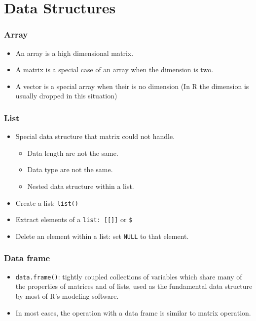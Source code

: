 \documentclass[10pt]{beamer}
\begin{document}
\section{Data Structures}

\begin{frame}
  \frametitle{Array}

  \begin{itemize}
  \item An array is a high dimensional matrix.
  \item A matrix is a special case of an array when the dimension is
    two.
  \item A vector is a special array when their is no dimension (In R
    the dimension is usually dropped in this situation)
  \end{itemize}
\end{frame}

\begin{frame}
  \frametitle{List}

  \begin{itemize}
  \item Special data structure that matrix could not handle.

    \begin{itemize}
    \item Data length are not the same.
    \item Data type are not the same.
    \item Nested data structure within a list.
    \end{itemize}

  \item Create a list: \texttt{list()}
  \item Extract elements of a \texttt{list: [[]]} or \texttt{\$}

  \item Delete an element within a list: set \texttt{NULL} to that element.

  \end{itemize}
\end{frame}


\begin{frame}
  \frametitle{Data frame}

  \begin{itemize}
  \item \texttt{data.frame()}: tightly coupled collections of
    variables which share many of the properties of matrices and of
    lists, used as the fundamental data structure by most of R's
    modeling software.

  \item In most cases, the operation with a data frame is similar to
    matrix operation.

  \end{itemize}

\end{frame}
\end{document}
